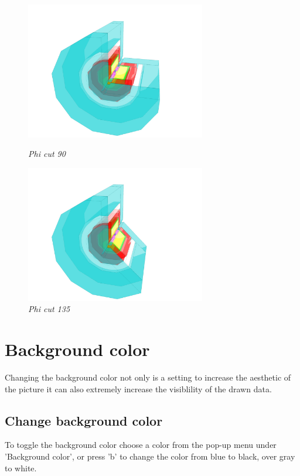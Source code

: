\documentclass[a4paper,10pt]{article}
\begin{document}
\begin{figure}[h]
\begin{minipage}[t]{6cm}
\centerline{\includegraphics[height=6cm]{phi_cut_90.png}}
\caption{\label{CEDViewer} \textsl{Phi cut 90}}
\end{minipage}
\begin{minipage}[t]{6cm}
\setlength{\fboxsep}{0mm}
\centerline{\includegraphics[height=6cm]{phi_cut_135.png}}
\caption{\label{User viewer}\textsl{Phi cut 135}}
\end{minipage}

\end{figure}


\section{Background color}
Changing the background color not only is a setting to increase the aesthetic of the picture it can also extremely increase the visiblility of the drawn data.
\subsection{Change background color}
To toggle the background color choose a color from the pop-up menu under 'Background color', or press 'b' to change the color from blue to black, over gray to white.
\end{document}
